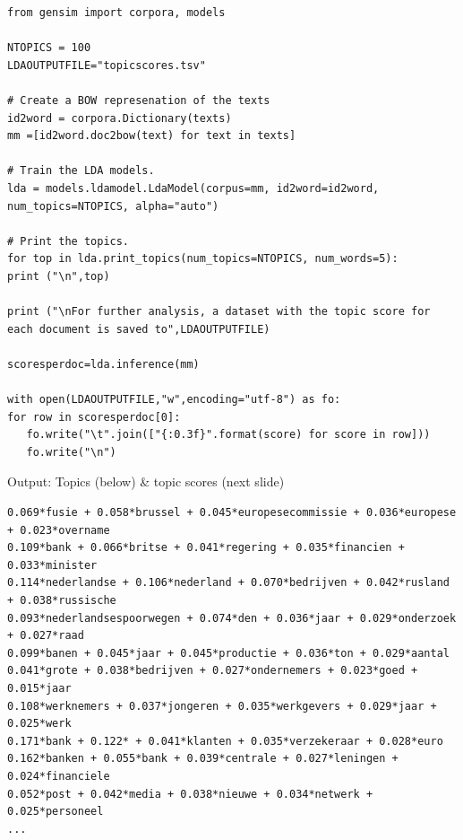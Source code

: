\documentclass[handout]{beamer}
\begin{document}
\begin{frame}
\begin{lstlisting}
from gensim import corpora, models

NTOPICS = 100
LDAOUTPUTFILE="topicscores.tsv"

# Create a BOW represenation of the texts
id2word = corpora.Dictionary(texts)
mm =[id2word.doc2bow(text) for text in texts]

# Train the LDA models.
lda = models.ldamodel.LdaModel(corpus=mm, id2word=id2word, num_topics=NTOPICS, alpha="auto")

# Print the topics.
for top in lda.print_topics(num_topics=NTOPICS, num_words=5):
print ("\n",top)

print ("\nFor further analysis, a dataset with the topic score for each document is saved to",LDAOUTPUTFILE)

scoresperdoc=lda.inference(mm)

with open(LDAOUTPUTFILE,"w",encoding="utf-8") as fo:
for row in scoresperdoc[0]:
   fo.write("\t".join(["{:0.3f}".format(score) for score in row]))
   fo.write("\n")
\end{lstlisting}

\end{frame}


\begin{frame}[fragile]{Output: Topics (below) \& topic scores (next slide)}
\begin{lstlisting}
0.069*fusie + 0.058*brussel + 0.045*europesecommissie + 0.036*europese + 0.023*overname
0.109*bank + 0.066*britse + 0.041*regering + 0.035*financien + 0.033*minister
0.114*nederlandse + 0.106*nederland + 0.070*bedrijven + 0.042*rusland + 0.038*russische
0.093*nederlandsespoorwegen + 0.074*den + 0.036*jaar + 0.029*onderzoek + 0.027*raad
0.099*banen + 0.045*jaar + 0.045*productie + 0.036*ton + 0.029*aantal
0.041*grote + 0.038*bedrijven + 0.027*ondernemers + 0.023*goed + 0.015*jaar
0.108*werknemers + 0.037*jongeren + 0.035*werkgevers + 0.029*jaar + 0.025*werk
0.171*bank + 0.122* + 0.041*klanten + 0.035*verzekeraar + 0.028*euro
0.162*banken + 0.055*bank + 0.039*centrale + 0.027*leningen + 0.024*financiele
0.052*post + 0.042*media + 0.038*nieuwe + 0.034*netwerk + 0.025*personeel
...
\end{lstlisting}
\end{frame}
\end{document}
